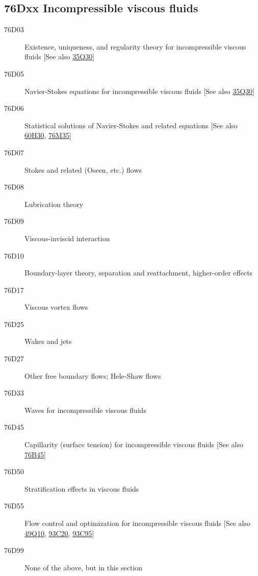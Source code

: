 \documentclass[letterpaper]{article}
\begin{document}
\subsection*{76Dxx  Incompressible viscous fluids }\label{76Dxx}
\begin{description}  
\item [76D03]\label{76D03} Existence, uniqueness, and regularity theory for incompressible viscous fluids [See also \hyperref[35Q30]{35Q30}]
\item [76D05]\label{76D05} Navier-Stokes equations for incompressible viscous fluids [See also \hyperref[35Q30]{35Q30}]
\item [76D06]\label{76D06} Statistical solutions of Navier-Stokes and related equations [See also \hyperref[60H30]{60H30}, \hyperref[76M35]{76M35}]
\item [76D07]\label{76D07} Stokes and related (Oseen, etc.) flows
\item [76D08]\label{76D08} Lubrication theory
\item [76D09]\label{76D09} Viscous-inviscid interaction
\item [76D10]\label{76D10} Boundary-layer theory, separation and reattachment, higher-order effects
\item [76D17]\label{76D17} Viscous vortex flows
\item [76D25]\label{76D25} Wakes and jets
\item [76D27]\label{76D27} Other free boundary flows; Hele-Shaw flows
\item [76D33]\label{76D33} Waves for incompressible viscous fluids
\item [76D45]\label{76D45} Capillarity (surface tension) for incompressible viscous fluids [See also \hyperref[76B45]{76B45}]
\item [76D50]\label{76D50} Stratification effects in viscous fluids
\item [76D55]\label{76D55} Flow control and optimization for incompressible viscous fluids [See also \hyperref[49Q10]{49Q10}, \hyperref[93C20]{93C20}, \hyperref[93C95]{93C95}]
\item [76D99]\label{76D99} None of the above, but in this section
\end{description}
\end{document}
